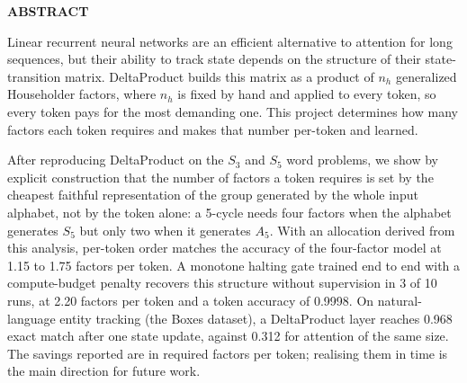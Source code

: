 \begin{center}
\textbf{{\Large ABSTRACT}}\\
\begin{center}
\justifying
Linear recurrent neural networks are an efficient alternative to attention for long sequences, but their ability to track state depends on the structure of their state-transition matrix. DeltaProduct builds this matrix as a product of $n_h$ generalized Householder factors, where $n_h$ is fixed by hand and applied to every token, so every token pays for the most demanding one. This project determines how many factors each token requires and makes that number per-token and learned.

After reproducing DeltaProduct on the $S_3$ and $S_5$ word problems, we show by explicit construction that the number of factors a token requires is set by the cheapest faithful representation of the group generated by the whole input alphabet, not by the token alone: a 5-cycle needs four factors when the alphabet generates $S_5$ but only two when it generates $A_5$. With an allocation derived from this analysis, per-token order matches the accuracy of the four-factor model at 1.15 to 1.75 factors per token. A monotone halting gate trained end to end with a compute-budget penalty recovers this structure without supervision in 3 of 10 runs, at 2.20 factors per token and a token accuracy of 0.9998. On natural-language entity tracking (the Boxes dataset), a DeltaProduct layer reaches 0.968 exact match after one state update, against 0.312 for attention of the same size. The savings reported are in required factors per token; realising them in time is the main direction for future work.
\end{center}
\end{center}
\noindent{}
